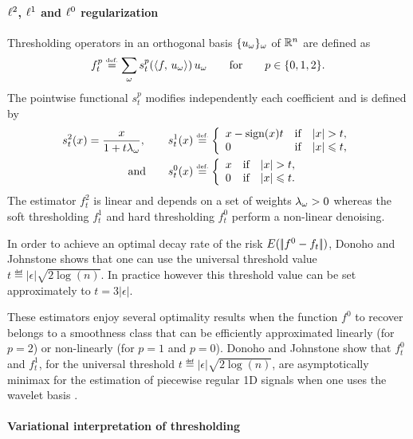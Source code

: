 \documentclass[final]{siamltex}
\newcommand{\F}{f}
\newcommand{\fz}{f^0}
\begin{document}
\paragraph{$\ell^2$, $\ell^1$ and $\ell^0$ regularization}

Thresholding operators in an orthogonal basis $\{u_\omega\}_\omega$ of $\mathbb{R}^n$ are defined as
\begin{equation}
	\label{eq-thresh-estimator}
	\F_t^p \eqdef \sum_\om s_t^p(\dotp{\F}{u_\om}) \, u_\om
	\qqforqq p \in \{0,1,2\}.
\end{equation}
The pointwise functional $s_t^p$ modifies independently each coefficient and is defined by
\begin{align*}
	s_t^2(x) = \frac{x}{1+t \lambda_\omega},
	\qquad
	s_t^1(x) & \stackrel{\mbox{\upshape\tiny def.}}{=}
	\left\{
	\begin{array}{lll}
		x-\text{sign}(x)t & \text{if} & |x| > t,\\
		0 & \text{if} & |x| \leqslant t,
	\end{array}
	\right.\\
	\qquad \text{and} \qquad
	s_t^0(x) & \stackrel{\mbox{\upshape\tiny def.}}{=} 
	\left\{
	\begin{array}{lll}
		x & \text{if} & |x| > t,\\
		0 & \text{if} & |x| \leqslant t.
	\end{array}
	\right.
\end{align*}
The estimator $\F_t^2$ is linear and depends on a set of weights $\lambda_\omega>0$ whereas the soft thresholding $\F_t^1$ and hard thresholding $\F_t^0$ perform a non-linear denoising. 

In order to achieve an optimal decay rate of the risk $E(\norm{\fz-\F_t})$, Donoho and Johnstone \cite{donoho-shrinkage} shows that one can use the universal threshold value $t \eqdef |\epsilon|\sqrt{2\log(n)}$. In practice however this threshold value can be set approximately to $t = 3 |\epsilon|$.

These estimators enjoy several optimality results when the function $\fz$ to recover belongs to a smoothness class that can be efficiently approximated linearly (for $p=2$) or non-linearly (for $p=1$ and $p=0$). Donoho and Johnstone \cite{donoho-shrinkage} show that $\F_t^0$ and $\F_t^1$, for the universal threshold $t \eqdef |\epsilon|\sqrt{2\log(n)}$, are asymptotically minimax for the estimation of piecewise regular 1D signals when one uses the wavelet basis \cite{mallat-book}. 


\paragraph{Variational interpretation of thresholding}
\end{document}
